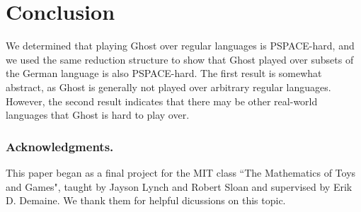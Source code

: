 \documentclass[runningheads,a4paper]{llncs}
\begin{document}
\section{Conclusion}
\label{Conclusion}

We determined that playing Ghost over regular languages is PSPACE-hard, and we used the same reduction structure to show that Ghost played over subsets of the German language is also PSPACE-hard. The first result is somewhat abstract, as Ghost is generally not played over arbitrary regular languages. However, the second result indicates that there may be other real-world languages that Ghost is hard to play over.

\subsubsection*{Acknowledgments.} This paper began as a final project for the MIT class ``The Mathematics of Toys and Games", taught by Jayson Lynch and Robert Sloan and supervised by Erik D. Demaine. We thank them for helpful dicussions on this topic.



\end{document}
